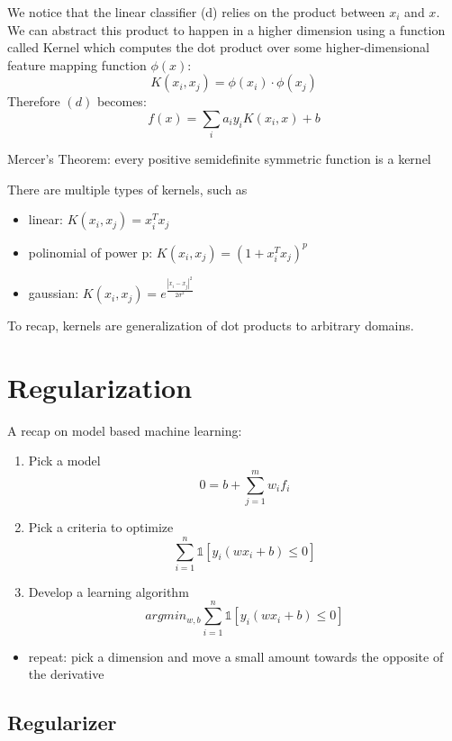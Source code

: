 \documentclass{article}
\begin{document}
We notice that the linear classifier (d) relies on the product between
\(x_i\) and \(x\). We can abstract this product to happen in a higher
dimension using a function called Kernel which computes the dot product
over some higher-dimensional feature mapping function \(\phi(x)\):
\[K(x_i, x_j) = \phi(x_i)\cdot \phi(x_j)\] Therefore \((d)\) becomes:
\[ f(x) = \sum_i a_iy_i K(x_i, x) + b \]

Mercer's Theorem: every positive semidefinite symmetric function is a
kernel

There are multiple types of kernels, such as

\begin{itemize}
\tightlist
\item
  linear: \(K(x_i, x_j) = x_i^T x_j\)
\item
  polinomial of power p: \(K(x_i, x_j) = (1+x_i^T x_j)^p\)
\item
  gaussian: \(K(x_i, x_j) = e^{\frac{|x_i-x_j|^2}{2\sigma ^2}}\)
\end{itemize}

To recap, kernels are generalization of dot products to arbitrary
domains.

\section{Regularization}\label{regularization}

A recap on model based machine learning:

\begin{enumerate}
\def\labelenumi{\arabic{enumi}.}
\tightlist
\item
  Pick a model \[0=b+\sum_{j=1}^mw_if_i\]
\item
  Pick a criteria to optimize
  \[\sum_{i=1}^n\mathbb{1}[y_i(wx_i+b)\le 0]\]
\item
  Develop a learning algorithm
  \[argmin_{w, b}\sum_{i=1}^n\mathbb{1}[y_i(wx_i+b)\le 0]\]
\end{enumerate}

\begin{itemize}
\tightlist
\item
  repeat: pick a dimension and move a small amount towards the opposite
  of the derivative
\end{itemize}

\subsection{Regularizer}\label{regularizer}
\end{document}
